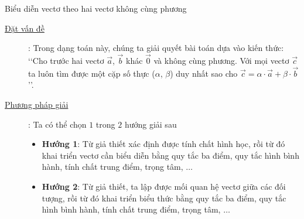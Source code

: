	\begin{dang}{Biểu diễn vectơ theo hai vectơ không cùng phương}%
	\begin{description}
		\item[\underline{Đặt vấn đề}]: Trong dạng toán này, chúng ta giải quyết bài toán dựa vào kiến thức: \lq\lq Cho trước hai vectơ $\overrightarrow{a}$, $\overrightarrow{b}$ khác $\overrightarrow{0}$ và không cùng phương. Với mọi vectơ $\overrightarrow{c}$ ta luôn tìm được một cặp số thực ($\alpha$, $\beta$) duy nhất sao cho $\overrightarrow{c}=\alpha\cdot \overrightarrow{a}+\beta\cdot \overrightarrow{b}$\rq\rq.
		\item[\underline{Phương pháp giải}]: Ta có thể chọn $1$ trong $2$ hướng giải sau
		\begin{itemize}
			\item \textbf{Hướng 1}: Từ giả thiết xác định được tính chất hình học, rồi từ đó khai triển vectơ cần biểu diễn bằng quy tắc ba điểm, quy tắc hình bình hành, tính chất trung điểm, trọng tâm, $\ldots$
			\item \textbf{Hướng 2}: Từ giả thiết, ta lập được mối quan hệ vectơ giữa các đối tượng, rồi từ đó khai triển biểu thức bằng quy tắc ba điểm, quy tắc hình bình hành, tính chất trung điểm, trọng tâm, $\ldots$
		\end{itemize}
	\end{description}
\end{dang}

